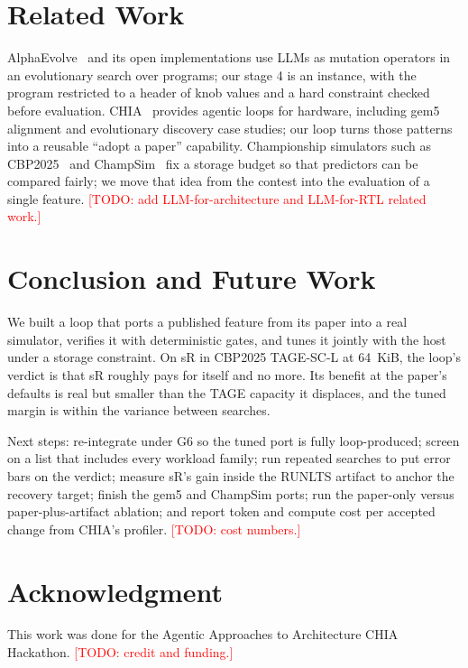 \documentclass[conference]{IEEEtran}
\newcommand{\todo}[1]{\textcolor{red}{[TODO: #1]}}
\begin{document}
\section{Related Work}

AlphaEvolve~\cite{alphaevolve} and its open implementations use LLMs as mutation
operators in an evolutionary search over programs; our stage 4 is an instance,
with the program restricted to a header of knob values and a hard constraint
checked before evaluation. CHIA~\cite{chia} provides agentic loops for
hardware, including gem5 alignment and evolutionary discovery case studies; our
loop turns those patterns into a reusable ``adopt a paper'' capability.
Championship simulators such as CBP2025~\cite{cbp2025kit} and
ChampSim~\cite{champsim} fix a storage budget so that predictors can be
compared fairly; we move that idea from the contest into the evaluation of a
single feature. \todo{add LLM-for-architecture and LLM-for-RTL related work.}

\section{Conclusion and Future Work}

We built a loop that ports a published feature from its paper into a real
simulator, verifies it with deterministic gates, and tunes it jointly with the
host under a storage constraint. On sR in CBP2025 TAGE-SC-L at 64~KiB, the
loop's verdict is that sR roughly pays for itself and no more. Its benefit at
the paper's defaults is real but smaller than the TAGE capacity it displaces,
and the tuned margin is within the variance between searches.

Next steps: re-integrate under G6 so the tuned port is fully loop-produced;
screen on a list that includes every workload family; run repeated searches to
put error bars on the verdict; measure sR's gain inside the RUNLTS artifact to
anchor the recovery target; finish the gem5 and ChampSim ports; run the
paper-only versus paper-plus-artifact ablation; and report token and compute
cost per accepted change from CHIA's profiler. \todo{cost numbers.}

\section*{Acknowledgment}
This work was done for the Agentic Approaches to Architecture CHIA Hackathon.
\todo{credit and funding.}
\end{document}

